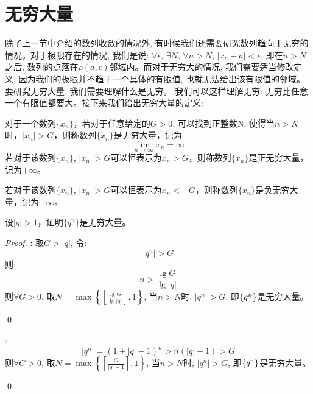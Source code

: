 \section{无穷大量}
除了上一节中介绍的数列收敛的情况外, 有时候我们还需要研究数列趋向于无穷的情况。对于极限存在的情况, 我们是说: $\forall \epsilon$, $\exists N$, $\forall n > N$, $|x_n - a| < \epsilon$, 即在$n > N$之后, 数列的点落在$\rho(a, \epsilon)$邻域内。而对于无穷大的情况, 我们需要适当修改定义, 因为我们的极限并不趋于一个具体的有限值, 也就无法给出该有限值的邻域。要研究无穷大量, 我们需要理解什么是无穷。 我们可以这样理解无穷: 无穷比任意一个有限值都要大。接下来我们给出无穷大量的定义:
\begin{definition}[无穷大量]
对于一个数列$\{ x_n \}$，若对于任意给定的$G > 0$, 可以找到正整数N, 使得当$n > N$时，$| x_n |> G$，则称数列$\{ x_n \}$是无穷大量，记为
\[ \lim_{n \to \infty } x_n = \infty \]
若对于该数列$\{ x_n \}$, $| x_n |> G$可以恒表示为$x_n > G$，则称数列$\{ x_n \}$是正无穷大量，记为$+\infty$。

若对于该数列$\{ x_n \}$, $| x_n |> G$可以恒表示为$x_n < -G$，则称数列$\{ x_n \}$是负无穷大量，记为$-\infty$。
\end{definition}

\begin{example}
    设$| q | > 1$，证明$\{ q^n \}$是无穷大量。 
\end{example}
\begin{proof}
    : 取$G > |q|$, 令:
    \begin{equation*}
        \left| q^n \right| > G
    \end{equation*}
    则:
    \begin{equation*}
        n > \frac{\lg{G}}{\lg{|q|}}
    \end{equation*}
    则$\forall G > 0$, 取$N = \max\left\{\left[\frac{\lg{G}}{\lg{|q|}}\right], 1\right\}$, 当$n > N$时, $\left| q^n \right| > G$, 即$\left\{ q^n\right\}$是无穷大量。

    \qed

    :
    \begin{equation*}
        \left| q^n \right| = (1 + |q| - 1)^n > n(|q| - 1) > G
    \end{equation*}
    则$\forall G > 0$, 取$N = \max\left\{\left[\frac{G}{|q|-1}\right], 1\right\}$, 当$n > N$时, $\left| q^n \right| > G$, 即$\left\{ q^n\right\}$是无穷大量。

    \qed
\end{proof}

